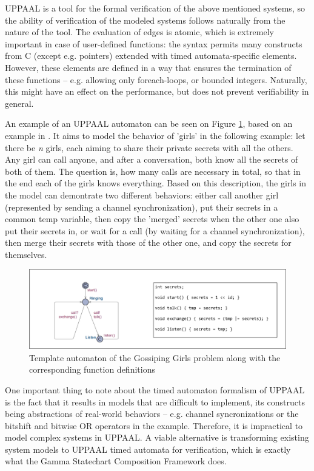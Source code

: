 UPPAAL is a tool for the formal verification of the above mentioned systems, so the ability of verification of the modeled systems follows naturally from the nature of the tool. The evaluation of edges is atomic, which is extremely important in case of user-defined functions: the syntax permits many constructs from C (except e.g. pointers) extended with timed automata-specific elements. However, these elements are defined in a way that ensures the termination of these functions -- e.g. allowing only foreach-loops, or bounded integers. Naturally, this might have an effect on the performance, but does not prevent verifiability in general.

An example of an UPPAAL automaton can be seen on Figure \ref{fig:UPPAALGossipingGirls}, based on an example in \cite{UPPAALTutorial}. It aims to model the behavior of 'girls' in the following example: let there be \textit{n} girls, each aiming to share their private secrets with all the others. Any girl can call anyone, and after a conversation, both know all the secrets of both of them. The question is, how many calls are necessary in total, so that in the end each of the girls knows everything. Based on this description, the girls in the model can demontrate two different behaviors: either call another girl (represented by sending a channel synchronization), put their secrets in a common temp variable, then copy the 'merged' secrets when the other one also put their secrets in, or wait for a call (by waiting for a channel synchronization), then merge their secrets with those of the other one, and copy the secrets for themselves.

\begin{figure}[!ht]
	\centering
	\includegraphics[width=150mm, keepaspectratio]{figures/UPPAALGossipingGirls.png}
	\caption{Template automaton of the Gossiping Girls problem along with the corresponding function definitions}
	\label{fig:UPPAALGossipingGirls}
\end{figure}

One important thing to note about the timed automaton formalism of UPPAAL is the fact that it results in models that are difficult to implement, its constructs being abstractions of real-world behaviors -- e.g. channel syncronizations or the bitshift and bitwise OR operators in the example. Therefore, it is impractical to model complex systems in UPPAAL. A viable alternative is transforming existing system models to UPPAAL timed automata for verification, which is exactly what the Gamma Statechart Composition Framework does.

